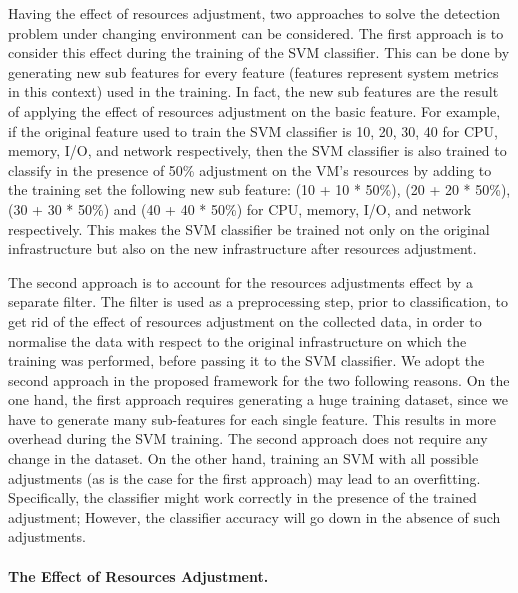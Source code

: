 \documentclass[twocolumn]{bmcart}%
\begin{document}
Having the effect of resources adjustment, two approaches to solve the detection problem under changing environment can be considered. The first approach is to consider this effect during the training of the SVM classifier. This can be done by generating new sub features for every feature (features represent system metrics in this context) used in the training. In fact, the new sub features are the result of applying the effect of resources adjustment on the basic feature. For example, if the original feature used to train the SVM classifier is 10, 20, 30, 40 for CPU, memory, I/O, and network respectively, then the SVM classifier is also trained to classify in the presence of 50\% adjustment on the VM's resources by adding to the training set the following new sub feature: (10 + 10 * 50\%), (20 + 20 * 50\%), (30 + 30 * 50\%) and (40 + 40 * 50\%) for CPU, memory, I/O, and network respectively. This makes the SVM classifier be trained not only on the original infrastructure but also on the new infrastructure after resources adjustment.

The second approach is to account for the resources adjustments effect by a separate filter. The filter is used as a preprocessing step, prior to classification, to get rid of the effect of resources adjustment on the collected data, in order to normalise the data with respect to the original infrastructure on which the training was performed, before passing it to the SVM classifier. We adopt the second approach in the proposed framework for the two following reasons. On the one hand, the first approach requires generating a huge training dataset, since we have to generate many sub-features for each single feature. This results in more overhead during the SVM training. The second approach does not require any change in the dataset. On the other hand, training an SVM with all possible adjustments (as is the case for the first approach) may lead to an overfitting. Specifically, the classifier might work correctly in the presence of the trained adjustment; However, the classifier accuracy will go down in the absence of such adjustments.

\paragraph{The Effect of Resources Adjustment.}
\end{document}
